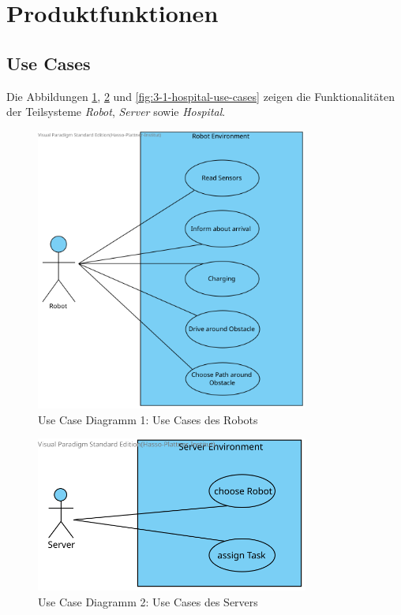 \section{Produktfunktionen}

		\subsection{Use Cases}
		
		Die Abbildungen \ref{fig:3-1-robot-use-cases}, \ref{fig:3-1-server-use-cases} und \ref{fig:3-1-hospital-use-cases} zeigen die Funktionalitäten der Teilsysteme \emph{Robot}, \emph{Server} sowie \emph{Hospital}.
		
			\begin{figure}[H]
				\centering
				\includegraphics[width=0.8\textwidth]{img/1-Analyse-3-Robot}
				\caption{Use Case Diagramm 1: Use Cases des Robots}
				\label{fig:3-1-robot-use-cases}
			\end{figure}

			\begin{figure}[H]
				\centering
				\includegraphics[width=0.8\textwidth]{img/1-Analyse-3-Server}
				\caption{Use Case Diagramm 2: Use Cases des Servers}
				\label{fig:3-1-server-use-cases}
			\end{figure}

